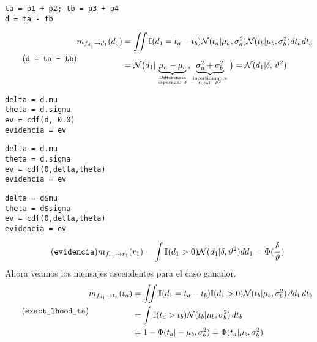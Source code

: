 \documentclass[article]{jss}
\newcommand{\N}{\mathcal{N}}
\newcommand\hfrac[2]{\genfrac{}{}{0pt}{}{#1}{#2}} %
\begin{document}
%
\begin{lstlisting}[backgroundcolor=\color{all}]
ta = p1 + p2; tb = p3 + p4
d = ta - tb
\end{lstlisting}
%
\begin{equation}\label{eq:m_fd_d} \tag{\texttt{d = ta - tb}}
 \begin{split} 
  m_{f_{d_1} \rightarrow d_1}(d_1) & = \iint \mathbb{I}(d_1 = t_a - t_b) \N(t_a| \mu_a, \sigma_a^2)  \N(t_b| \mu_b, \sigma_b^2)  dt_adt_b \\[0.25cm]
  & = \N\big( d_1 | \underbrace{\mu_a - \mu_b}_{\hfrac{\text{Differencia}}{\text{esperada:} \ \delta} }, \underbrace{\sigma_a^2 +\sigma_b^2}_{\hfrac{\text{incertidumbre}}{\text{total:} \ \vartheta^2}}  \big) = \N(d_1 | \delta, \, \vartheta^2)
 \end{split}
\end{equation}
%
\begin{paracol}{3}
\begin{lstlisting}[backgroundcolor=\color{julia}]
delta = d.mu
theta = d.sigma
ev = cdf(d, 0.0)
evidencia = ev
\end{lstlisting}  
 \switchcolumn
\begin{lstlisting}[backgroundcolor=\color{python}]
delta = d.mu
theta = d.sigma
ev = cdf(0,delta,theta) 
evidencia = ev
\end{lstlisting} 
 \switchcolumn
\begin{lstlisting}[backgroundcolor=\color{r}]
delta = d$mu
theta = d$sigma
ev = cdf(0,delta,theta) 
evidencia = ev
\end{lstlisting}   
\end{paracol}
%
\begin{equation}\label{eq:m_fr_r} \tag{\texttt{evidencia}}
\begin{split}
 m_{f_{r_1} \rightarrow r_1}(r_1) = \int \mathbb{I}(d_1 > 0) \N(d_1 | \delta, \vartheta^2)  dd_1 = \Phi(\frac{\delta}{\vartheta})
\end{split}
\end{equation}
%
Ahora veamos los mensajes ascendentes para el caso ganador.
%
\begin{equation}\label{eq:m_fd_ta} \tag{\texttt{exact\_lhood\_ta}}
\begin{split}
m_{f_{d_1} \rightarrow t_a}(t_a) & = \iint \mathbb{I}(d_1 = t_a - t_b) \mathbb{I}(d_1 > 0) \N(t_b | \mu_b , \sigma_b^2 ) \, dd_1\,dt_b \\
& = \int \mathbb{I}( t_a > t_b)  \N(t_b | \mu_b , \sigma_b^2 ) \,dt_b  \\
& = 1 - \Phi (t_a| -\mu_b, \sigma_b^2) = \Phi (t_a| \mu_b, \sigma_b^2)
\end{split}
\end{equation}
\end{document}
